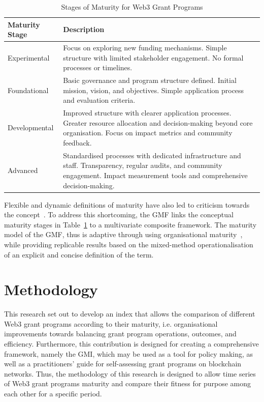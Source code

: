 \documentclass[conference]{IEEEtran}
\begin{document}
\begin{table}[htbp]
\caption{Stages of Maturity for Web3 Grant Programs}
\footnotesize
\begin{tabular}{p{2cm}p{6cm}}
\hline
\textbf{Maturity Stage} & \textbf{Description} \\
\hline
Experimental & Focus on exploring new funding mechanisms. Simple structure with limited stakeholder engagement. No formal processes or timelines. \\
\hline
Foundational & Basic governance and program structure defined. Initial mission, vision, and objectives. Simple application process and evaluation criteria. \\
\hline
Developmental & Improved structure with clearer application processes. Greater resource allocation and decision-making beyond core organisation. Focus on impact metrics and community feedback. \\
\hline
Advanced & Standardised processes with dedicated infrastructure and staff. Transparency, regular audits, and community engagement. Impact measurement tools and comprehensive decision-making. \\
\hline
\end{tabular}
\label{tab:grant_maturity}
\end{table}

Flexible and dynamic definitions of maturity have also led to criticism towards the concept~\cite[p.~8]{pereira_review_2020}. To address this shortcoming, the GMF links the conceptual maturity stages in Table~\ref{tab:grant_maturity} to a multivariate composite framework. The maturity model of the GMF, thus is adaptive through using organisational maturity~\cite{andersen_e-government_2006,johansson_roadmap_2019}, while providing replicable results based on the mixed-method operationalisation of an explicit and concise definition of the term.

\section{Methodology}\label{sec_3}


This research set out to develop an index that allows the comparison of different Web3 grant programs according to their maturity, i.e. organisational improvements towards balancing grant program operations, outcomes, and efficiency. Furthermore, this contribution is designed for creating a comprehensive framework, namely the GMI, which may be used as a tool for policy making, as well as a practitioners’ guide for self-assessing grant programs on blockchain networks. Thus, the methodology of this research is designed to allow time series of Web3 grant programs maturity and compare their fitness for purpose among each other for a specific period.
\end{document}
